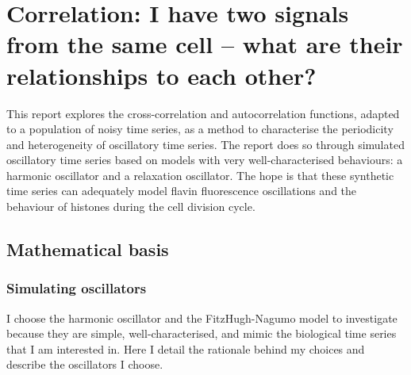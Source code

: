 \section{Correlation: I have two signals from the same cell -- what are their relationships to each other?}
\label{sec:analysis-correlation}

This report explores the cross-correlation and autocorrelation functions, adapted to a population of noisy time series, as a method to characterise the periodicity and heterogeneity of oscillatory time series.  The report does so through simulated oscillatory time series based on models with very well-characterised behaviours: a harmonic oscillator and a relaxation oscillator.  The hope is that these synthetic time series can adequately model flavin fluorescence oscillations and the behaviour of histones during the cell division cycle.

\subsection{Mathematical basis}
\label{sec:analysis-correlation-maths}
\subsubsection{Simulating oscillators}
\label{sec:analysis-correlation-maths-osc}

I choose the harmonic oscillator and the FitzHugh-Nagumo model to investigate because they are simple, well-characterised, and mimic the biological time series that I am interested in.  Here I detail the rationale behind my choices and describe the oscillators I choose.

